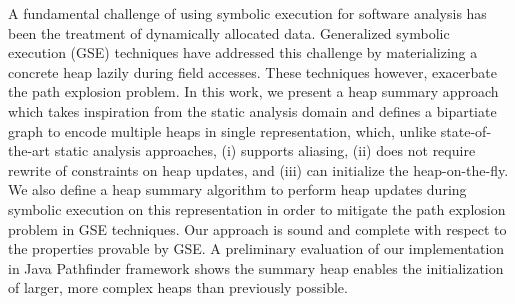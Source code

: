 A fundamental challenge of using symbolic execution for software
analysis has been the treatment of dynamically allocated
data. Generalized symbolic execution (GSE) techniques have addressed
this challenge by materializing a concrete heap lazily during field
accesses.  These techniques however, exacerbate the path explosion
problem.  In this work, we present a heap summary approach which takes
inspiration from the static analysis domain and defines a bipartiate
graph to encode multiple heaps in single representation, which, unlike
state-of-the-art static analysis approaches, (i) supports aliasing,
(ii) does not require rewrite of constraints on heap updates, and
(iii) can initialize the heap-on-the-fly. We also define a heap
summary algorithm to perform heap updates during symbolic execution on
this representation in order to mitigate the path explosion problem in
GSE techniques. Our approach is sound and complete with respect to the
properties provable by GSE. A preliminary evaluation of our
implementation in Java Pathfinder framework shows the summary heap
enables the initialization of larger, more complex heaps than
previously possible.

\begin{comment}
A fundamental challenge of using symbolic execution for software
analysis has been the treatment of dynamically allocated data.
State-of-the-art techniques have addressed this challenge through
either (a) the use of summaries that over-approximate possible heaps, or
(b) by materializing a concrete heap lazily during generalized
symbolic execution. In this work, we present a novel heap
initialization and analysis technique which takes inspiration from
both approaches and constructs precise heap summaries lazily during
symbolic execution.  Our approach is 1) \emph{scalable}: it reduces the
points of non-determinism compared to generalized symbolic execution
and explores each control-flow path only once for any given set of
isomorphic heaps, 2) \emph{precise}: at any given point during symbolic
execution, the symbolic heap represents the exact set of feasible
concrete heap structures for the program under analysis, and 3)
\emph{expressive}: the symbolic heap can represent recursive data
structures. We demonstrate the precision and scalability of our
approach by implementing it as an extension to the Symbolic PathFinder
framework for analyzing Java programs.
\end{comment}


